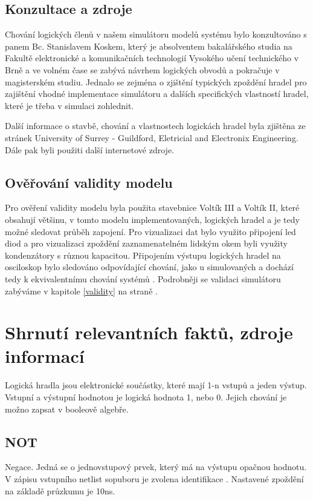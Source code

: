 \documentclass[11pt,a4paper]{article}
\begin{document}
		\subsection{Konzultace a zdroje}
			Chování logických členů v našem simulátoru modelů systému  bylo konzultováno s panem Bc. Stanislavem Koskem, který je absolventem bakalářského studia na Fakultě elektronické a komunikačních technologií Vysokého učení technického v Brně a ve volném čase se zabývá návrhem logických obvodů a pokračuje v magisterském studiu. Jednalo se zejména o zjištění typických zpoždění hradel pro zajištění vhodné implementace simulátoru a dalších specifických vlastností hradel, které je třeba v simulaci zohlednit.

			Další informace o stavbě, chování a vlastnostech logickách hradel byla zjištěna ze stránek University of Surrey - Guildford, Eletricial and Electronix Engineering\cite{logicGate}. Dále pak byli použiti další internetové zdroje\cite{logicGateWiki}.

		\subsection{Ověřování validity modelu}
			Pro ověření validity modelu  byla použita stavebnice Voltík III a Voltík II, které obsahují většinu, v tomto modelu implementovaných, logických hradel a je tedy možné sledovat průběh zapojení. Pro vizualizaci dat bylo využito připojení led diod a pro vizualizaci zpoždění zaznamenatelném lidským okem byli využity kondenzátory s různou kapacitou. Připojením výstupu logických hradel na osciloskop bylo sledováno odpovídající chování, jako u simulovaných a dochází tedy k ekvivalentnímu chování systémů . Podrobněji se validaci simulátoru zabýváme v kapitole \ref{validity} na straně \pageref{validity}.


	\section{Shrnutí relevantních faktů, zdroje informací}

		Logická hradla jsou elektronické součástky, které mají 1-n vstupů a jeden výstup. Vstupní a výstupní hodnotou je logická hodnota 1, nebo 0. Jejich chování je možno zapsat v booleově algebře. \cite{logicGate}

			\subsection{NOT}
				Negace. Jedná se o jednovstupový prvek, který má na výstupu opačnou hodnotu. V zápisu vstupního netlist sopuboru je zvolena identifikace . Nastavené zpoždění na základě průzkumu je 10ns\cite{notSheet}.
\end{document}
